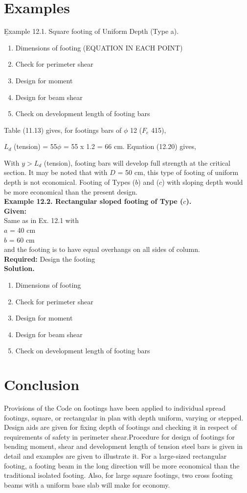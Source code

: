 \documentclass{book}
\begin{document}
\section{Examples}
\b Example 12.1. Square footing of Uniform Depth (Type a).
\begin{enumerate}
\item Dimensions of footing (EQUATION IN EACH POINT)
\item  Check for perimeter shear
\item  Design for moment
\item Design for beam shear
\item Check on development length of footing bars
\end{enumerate}
Table (11.13) gives, for footings bars of $\phi$ 12 ($F_e$ 415),

$L_d$ (tension) = 55$\phi$ = 55 x 1.2 = 66 cm.
Equation (12.20) gives,


With $y > L_d$ (tension), footing bars will develop full strength at the critical section. It may be noted that with $D$ = 50 cm, this type of footing of uniform depth is not economical. Footing of Types ($b$) and ($c$) with sloping depth would be more economical than the present design.\\

\textbf{ Example 12.2. Rectangular sloped footing of Type ($c$).}\\
\textbf{Given:}\\
Same as in Ex. 12.1 with\\
$a$ = 40 cm\\
$b$ = 60 cm\\
and the footing is to have equal overhangs on all sides of column.\\
\textbf{Required:} Design the footing\\
\textbf{Solution.}
\begin{enumerate}
\item  Dimensions of footing
\item Check for perimeter shear
\item Design for moment
\item Design for beam shear
\item Check on development length of footing bars
\end{enumerate}

\section{Conclusion}
Provisions of the Code on footings have been applied to individual spread footings, square, or rectangular in plan with depth uniform, varying or stepped. Design aids are given for ﬁxing depth of footings and checking it in respect of requirements of safety in perimeter shear.Procedure for design of footings for bending moment, shear and development length of tension steel bars is given in detail and examples are given to illustrate it. For a large-sized rectangular footing, a footing beam in the long direction will be more economical than the traditional isolated footing. Also, for large square footings, two cross footing beams with a uniform base slab will make for economy.
\end{document}
